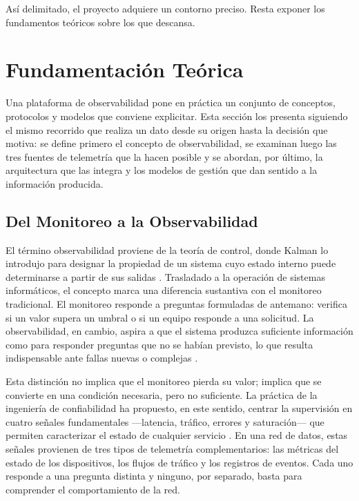 Así delimitado, el proyecto adquiere un contorno preciso. Resta exponer los fundamentos teóricos sobre los que descansa.

\section{Fundamentación Teórica}
\label{sec:fundamentacion}

Una plataforma de observabilidad pone en práctica un conjunto de conceptos, protocolos y modelos que conviene explicitar. Esta sección los presenta siguiendo el mismo recorrido que realiza un dato desde su origen hasta la decisión que motiva: se define primero el concepto de observabilidad, se examinan luego las tres fuentes de telemetría que la hacen posible y se abordan, por último, la arquitectura que las integra y los modelos de gestión que dan sentido a la información producida.

\subsection{Del Monitoreo a la Observabilidad}

El término observabilidad proviene de la teoría de control, donde Kalman lo introdujo para designar la propiedad de un sistema cuyo estado interno puede determinarse a partir de sus salidas \cite{kalman1960general}. Trasladado a la operación de sistemas informáticos, el concepto marca una diferencia sustantiva con el monitoreo tradicional. El monitoreo responde a preguntas formuladas de antemano: verifica si un valor supera un umbral o si un equipo responde a una solicitud. La observabilidad, en cambio, aspira a que el sistema produzca suficiente información como para responder preguntas que no se habían previsto, lo que resulta indispensable ante fallas nuevas o complejas \cite{majors2022observability}.

Esta distinción no implica que el monitoreo pierda su valor; implica que se convierte en una condición necesaria, pero no suficiente. La práctica de la ingeniería de confiabilidad ha propuesto, en este sentido, centrar la supervisión en cuatro señales fundamentales ---latencia, tráfico, errores y saturación--- que permiten caracterizar el estado de cualquier servicio \cite{beyer2016sre}. En una red de datos, estas señales provienen de tres tipos de telemetría complementarios: las métricas del estado de los dispositivos, los flujos de tráfico y los registros de eventos. Cada uno responde a una pregunta distinta y ninguno, por separado, basta para comprender el comportamiento de la red.

